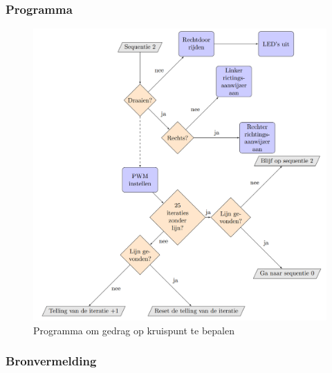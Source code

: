 \documentclass
   [kulak] %
   {kulakbeamer}
\begin{document}
\begin{frame}
	\frametitle{Programma}
	\begin{figure}
		\centering
		\includegraphics[width=.5\textwidth]{flowchart_grootProgramma}
		\caption{Programma om gedrag op kruispunt te bepalen}
	\end{figure}
\end{frame}

\begin{frame}
\frametitle{Bronvermelding}
	
	
	
\end{frame}
\end{document}
